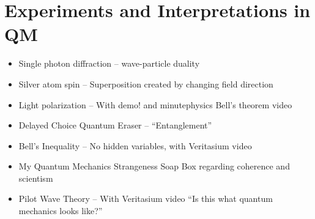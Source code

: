 \documentclass[12pt, openany, letterpaper]{memoir}
\begin{document}
\section*{Experiments and Interpretations in QM}
\begin{itemize}
	\item Single photon diffraction -- wave-particle duality
	\item Silver atom spin -- Superposition created by changing field direction
	\item Light polarization -- With demo! and minutephysics Bell's theorem video
	\item Delayed Choice Quantum Eraser -- “Entanglement”
	\item Bell's Inequality  -- No hidden variables, with Veritasium video
	\item My Quantum Mechanics Strangeness Soap Box regarding coherence and scientism
	\item Pilot Wave Theory -- With Veritasium video “Is this what quantum mechanics looks like?”
\end{itemize}
\end{document}
